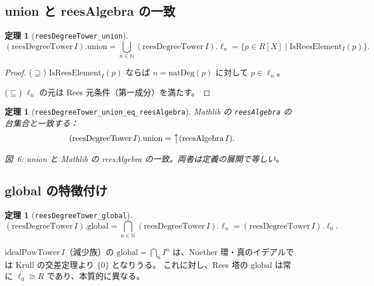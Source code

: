 \documentclass[a4paper,12pt]{article}
\theoremstyle{definition}
\theoremstyle{plain}
\newtheorem{theorem}[definition]{定理}
\newcommand{\figcap}[1]{\begin{center}\small\textit{#1}\end{center}}
\newcommand{\Ipower}[1]{I^{#1}}
\newcommand{\reesdeg}{\mathrm{reesDegreeTower}}
\newcommand{\idealpow}{\mathrm{idealPowTower}}
\newcommand{\lev}[1]{\ell_{#1}}
\newcommand{\IsRees}{\mathrm{IsReesElement}}
\newcommand{\natDeg}{\mathrm{natDeg}}
\newcommand{\unionop}{\mathrm{union}}
\newcommand{\globalop}{\mathrm{global}}
\begin{document}
\subsection{union と reesAlgebra の一致}

\begin{theorem}[\texttt{reesDegreeTower\_union}]
\[
  (\reesdeg\,I).\unionop
  = \bigcup_{n \in \mathbb{N}} (\reesdeg\,I).\lev{n}
  = \{ p \in R[X] \mid \IsRees_I(p) \}.
\]
\end{theorem}
\begin{proof}
($\supseteq$) $\IsRees_I(p)$ ならば $n = \natDeg(p)$ に対して $p \in \lev{n}$。

\noindent($\subseteq$) $\lev{n}$ の元は Rees 元条件（第一成分）を満たす。
\end{proof}

\begin{theorem}[\texttt{reesDegreeTower\_union\_eq\_reesAlgebra}]
Mathlib の \texttt{reesAlgebra} の台集合と一致する：
\[
  (\reesdeg\,I).\unionop = \bigl\uparrow(\mathrm{reesAlgebra}\,I).
\]
\end{theorem}

\begin{center}
\end{center}
\figcap{図~6: union と Mathlib の reesAlgebra の一致。両者は定義の展開で等しい。}

\subsection{global の特徴付け}

\begin{theorem}[\texttt{reesDegreeTower\_global}]
\[
  (\reesdeg\,I).\globalop
  = \bigcap_{n \in \mathbb{N}} (\reesdeg\,I).\lev{n}
  = (\reesdeg\,I).\lev{0}.
\]
\end{theorem}

$\idealpow\,I$（減少族）の $\globalop = \bigcap_n \Ipower{n}$
は、Noether 環・真のイデアルでは Krull の交差定理より $\{0\}$ となりうる。
これに対し、Rees 塔の global は常に $\lev{0} \cong R$ であり、本質的に異なる。
\end{document}
